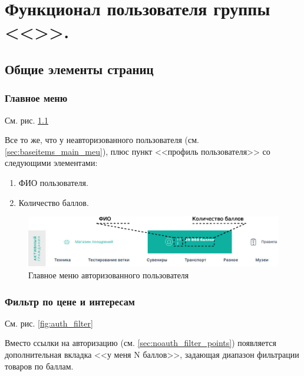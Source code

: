 \chapter{Функционал пользователя группы <<>>.}

    \section{Общие элементы страниц}
        \subsection{Главное меню}
            
            См. рис. \ref{fig:auth_main_menu}

            Все то же, что у неавторизованного пользователя (см.\ref{sec:baseitems_main_meu}), 
            плюс пункт <<профиль пользователя>> со следующими элементами:
            
            \begin{enumerate}
                \item ФИО пользователя.
                \item Количество баллов.
            \end{enumerate}


        \begin{figure}
            \center
            \includegraphics[width=170mm]{04_auth_funcs/figures/01.eps}
            \caption{Главное меню авторизованного пользователя}
            \label{fig:auth_main_menu}
        \end{figure}
        
        \subsection{Фильтр по цене и интересам}

            См. рис. \ref{fig:auth_filter}

            Вместо ссылки на авторизацию (см. \ref{sec:noauth_filter_points}) появляется дополнительная вкладка
            <<у меня N баллов>>, задающая диапазон фильтрации товаров по баллам.
            
